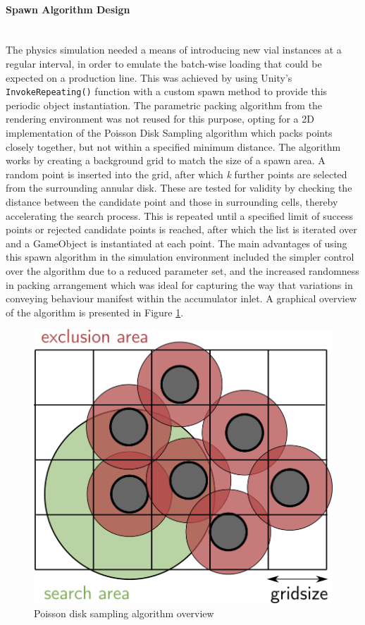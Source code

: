 \documentclass[10pt]{article}
\newcommand{\subsubsubsection}[1]{\paragraph{#1}\mbox{}\\}
\begin{document}
\subsubsubsection{Spawn Algorithm Design}
The physics simulation needed a means of introducing new vial instances at a regular interval, in order to emulate the batch-wise loading that could be expected on a production line. This was achieved by using Unity's \texttt{InvokeRepeating()} function with a custom spawn method to provide this periodic object instantiation. The parametric packing algorithm from the rendering environment was not reused for this purpose, opting for a 2D implementation of the Poisson Disk Sampling algorithm \cite{bridson2007fast} which packs points closely together, but not within a specified minimum distance. The algorithm works by creating a background grid to match the size of a spawn area. A random point is inserted into the grid, after which \textit{k} further points are selected from the surrounding annular disk. These are tested for validity by checking the distance between the candidate point and those in surrounding cells, thereby accelerating the search process. This is repeated until a specified limit of success points or rejected candidate points is reached, after which the list is iterated over and a GameObject is instantiated at each point. The main advantages of using this spawn algorithm in the simulation environment included the simpler control over the algorithm due to a reduced parameter set, and the increased randomness in packing arrangement which was ideal for capturing the way that variations in conveying behaviour manifest within the accumulator inlet. A graphical overview of the algorithm is presented in Figure \ref{fig:simulation_spawn}.

\begin{figure}[hbt]
\centering
\includegraphics[width=0.44\linewidth]{images/Spawn_Pds.png}
\caption{Poisson disk sampling algorithm overview}
\label{fig:simulation_spawn}
\end{figure}
\end{document}
